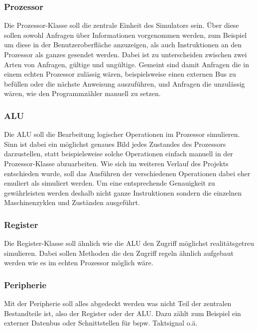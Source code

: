 \documentclass[12pt]{article}
\begin{document}
\subsubsection{Prozessor}
Die Prozessor-Klasse soll die zentrale Einheit des Simulators sein. Über diese sollen sowohl Anfragen über Informationen vorgenommen werden, zum Beispiel um diese in der Benutzeroberfläche anzuzeigen, als auch Instruktionen an den Prozessor als ganzes gesendet werden. Dabei ist zu unterscheiden zwischen zwei Arten von Anfragen, gültige und ungültige. Gemeint sind damit Anfragen die in einem echten Prozessor zulässig wären, beispielsweise einen externen Bus zu befüllen oder die nächste Anweisung auszuführen, und Anfragen die unzulässig wären, wie den Programmzähler manuell zu setzen.

\subsubsection{ALU}
Die ALU soll die Bearbeitung logischer Operationen im Prozessor simulieren. Sinn ist dabei ein möglichst genaues Bild jedes Zustandes des Prozessors darzustellen, statt beispielsweise solche Operationen einfach manuell in der Prozessor-Klasse abzuarbeiten. Wie sich im weiteren Verlauf des Projekts entschieden wurde, soll das Ausführen der verschiedenen Operationen dabei eher emuliert als simuliert werden. Um eine entsprechende Genauigkeit zu gewährleisten werden deshalb nicht ganze Instruktionen sondern die einzelnen Maschinenzyklen und Zuständen ausgeführt.

\subsubsection{Register}
Die Register-Klasse soll ähnlich wie die ALU den Zugriff möglichst realitätsgetreu simulieren. Dabei sollen Methoden die den Zugriff regeln ähnlich aufgebaut werden wie es im echten Prozessor möglich wäre.

\subsubsection{Peripherie}
Mit der Peripherie soll alles abgedeckt werden was nicht Teil der zentralen Bestandteile ist, also der Register oder der ALU. Dazu zählt zum Beispiel ein externer Datenbus oder Schnittstellen für bspw. Taktsignal o.ä.
\end{document}

